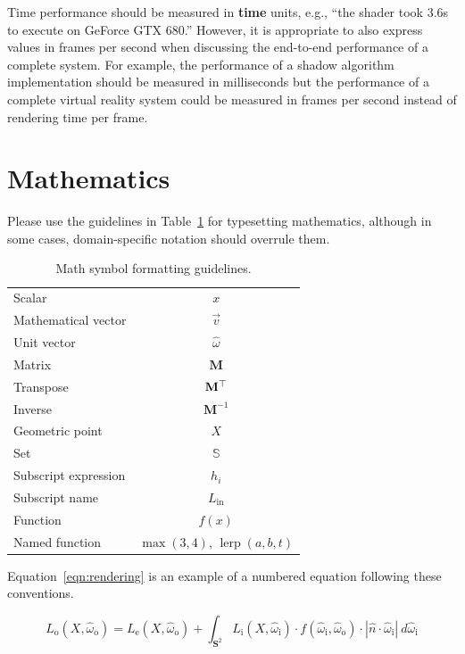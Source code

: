 \documentclass{jcgt}
\begin{document}
Time performance should be measured in \textbf{time} units, e.g., ``the shader took 3.6\;s to execute on GeForce GTX 680.''  However, it is appropriate to also express values in frames per second when discussing the end-to-end performance of a complete system.  For example, the performance of a shadow algorithm implementation should be measured in milliseconds but the performance of a complete virtual reality system could be measured in frames per second instead of rendering time per frame.

\section{Mathematics}
Please use the guidelines in Table~\ref{tbl:math} for typesetting mathematics, although in some cases, domain-specific notation should overrule them.

\begin{table}[htdp]
\small
\begin{center}
\begin{tabular}{l|c}
Scalar & $x$\\
Mathematical vector & $\vec{v}$ \\
Unit vector & $\hat{\omega}$ \\
Matrix & $\mathbf{M}$ \\
Transpose & $\mathbf{M}^\top$\\
Inverse & $\mathbf{M}^{-1}$\\
Geometric point & $X$ \\
Set & $\mathbb{S}$ \\
Subscript expression & $h_i$ \\
Subscript name & $L_\mathrm{in}$ \\
Function & $f(x)$ \\
Named function & $\max(3, 4)$, $\operatorname{lerp}(a, b, t)$
\end{tabular}
\end{center}
\caption{Math symbol formatting guidelines.}
\label{tbl:math}
\end{table}

\noindent Equation~\ref{eqn:rendering} is an example of a numbered equation following these conventions.

\begin{equation}
L_\mathrm{o}(X, \hat{\omega}_\mathrm{o}) = L_\mathrm{e}(X, \hat{\omega}_\mathrm{o}) + \int_{\mathbf{S}^2} L_\mathrm{i}(X, \hat{\omega}_\mathrm{i}) \cdot f(\hat{\omega}_\mathrm{i}, \hat{\omega}_\mathrm{o}) \cdot |\hat{n} \cdot \hat{\omega}_\mathrm{i} |~ d\hat{\omega}_\mathrm{i}
\label{eqn:rendering}
\end{equation}
\end{document}
